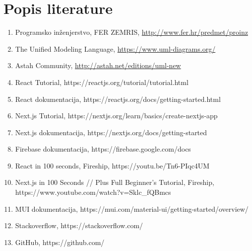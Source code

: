 \chapter*{Popis literature}
	 	
	
		
		
		\begin{enumerate}
			
			
			\item  Programsko inženjerstvo, FER ZEMRIS, \url{http://www.fer.hr/predmet/proinz}

			\item  The Unified Modeling Language, \url{https://www.uml-diagrams.org/}
			
			\item  Astah Community, \url{http://astah.net/editions/uml-new}
			\item React Tutorial, https://reactjs.org/tutorial/tutorial.html
			\item React dokumentacija, https://reactjs.org/docs/getting-started.html
			\item Next.js Tutorial, https://nextjs.org/learn/basics/create-nextjs-app
			\item Next.js dokumentacija, https://nextjs.org/docs/getting-started
			\item Firebase dokumentacija, https://firebase.google.com/docs
			\item React in 100 seconds, Fireship, https://youtu.be/Tn6-PIqc4UM
			\item Next.js in 100 Seconds // Plus Full Beginner's Tutorial, Fireship, https://www.youtube.com/watch?v=Sklc_fQBmcs
			\item MUI dokumentacija, https://mui.com/material-ui/getting-started/overview/
			\item Stackoverflow, https://stackoverflow.com/
			\item GitHub, https://github.com/
		\end{enumerate}
		
		 